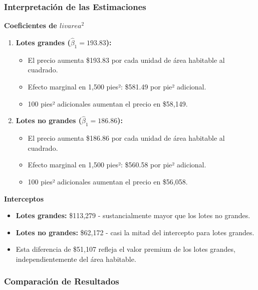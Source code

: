 \documentclass[12pt]{article}
\begin{document}
\subsubsection*{Interpretación de las Estimaciones}

\textbf{Coeficientes de $livarea^2$}

\begin{enumerate}
    \item \textbf{Lotes grandes ($\hat{\beta}_1 = 193.83$):}
    \begin{itemize}
        \item El precio aumenta \$193.83 por cada unidad de área habitable al cuadrado.
        \item Efecto marginal en 1,500 pies²: \$581.49 por pie² adicional.
        \item 100 pies² adicionales aumentan el precio en \$58,149.
    \end{itemize}
    
    \item \textbf{Lotes no grandes ($\hat{\beta}_1 = 186.86$):}
    \begin{itemize}
        \item El precio aumenta \$186.86 por cada unidad de área habitable al cuadrado.
        \item Efecto marginal en 1,500 pies²: \$560.58 por pie² adicional.
        \item 100 pies² adicionales aumentan el precio en \$56,058.
    \end{itemize}
\end{enumerate}

\textbf{Interceptos}

\begin{itemize}
    \item \textbf{Lotes grandes:} \$113,279 - sustancialmente mayor que los lotes no grandes.
    \item \textbf{Lotes no grandes:} \$62,172 - casi la mitad del intercepto para lotes grandes.
    \item Esta diferencia de \$51,107 refleja el valor premium de los lotes grandes, independientemente del área habitable.
\end{itemize}

\subsubsection*{Comparación de Resultados}
\end{document}
